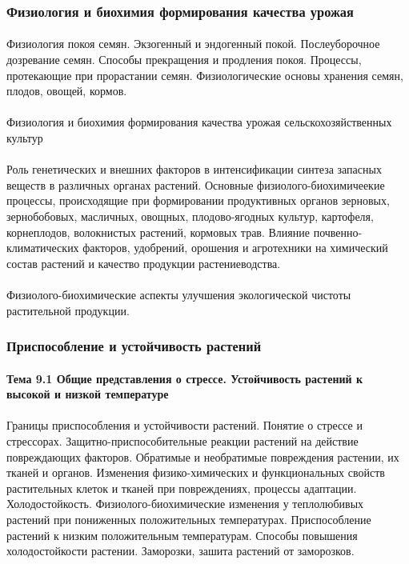 \subsubsection{Физиология и биохимия формирования качества урожая}

\paragraph*{}Физиология покоя семян. Экзогенный и эндогенный покой. Послеуборочное дозревание семян. Способы прекращения и продления покоя. Процессы, протекающие при прорастании семян. Физиологические основы хранения семян, плодов, овощей, кормов.

\paragraph*{}Физиология и биохимия формирования качества урожая сельскохозяйственных культур

\paragraph*{}Роль генетических и внешних факторов в интенсификации синтеза запасных веществ в различных органах растений. Основные физиолого-биохимичеекие процессы, происходящие при формировании продуктивных органов зерновых, зернобобовых, масличных, овощных, плодово-ягодных культур, картофеля, корнеплодов, волокнистых растений, кормовых трав. Влияние почвенно-климатических факторов, удобрений, орошения и агротехники на химический состав растений и качество продукции растениеводства.

\paragraph*{}Физиолого-биохимические аспекты улучшения экологической чистоты растительной продукции.

\subsubsection{Приспособление и устойчивость растений}

\paragraph*{Тема 9.1 Общие представления о стрессе. Устойчивость растений к высокой и низкой температуре}

\paragraph*{}Границы приспособления и устойчивости растений. Понятие о стрессе и стрессорах. Защитно-приспособительные реакции растений на действие повреждающих факторов. Обратимые и необратимые повреждения растении, их тканей и органов. Изменения физико-химических и функциональных свойств растительных клеток и тканей при повреждениях, процессы адаптации.
Холодостойкость. Физиолого-биохимические изменения у теплолюбивых растений при пониженных положительных температурах. Приспособление растений к низким положительным температурам. Способы повышения холодостойкости растении. Заморозки, зашита растений от заморозков.

